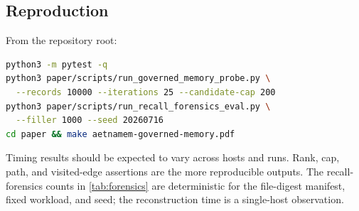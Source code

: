 \subsection{Reproduction}

From the repository root:

\begin{lstlisting}[language=bash]
python3 -m pytest -q
python3 paper/scripts/run_governed_memory_probe.py \
  --records 10000 --iterations 25 --candidate-cap 200
python3 paper/scripts/run_recall_forensics_eval.py \
  --filler 1000 --seed 20260716
cd paper && make aetnamem-governed-memory.pdf
\end{lstlisting}

Timing results should be expected to vary across hosts and runs. Rank, cap, path, and visited-edge assertions are the more reproducible outputs. The recall-forensics counts in \cref{tab:forensics} are deterministic for the file-digest manifest, fixed workload, and seed; the reconstruction time is a single-host observation.
